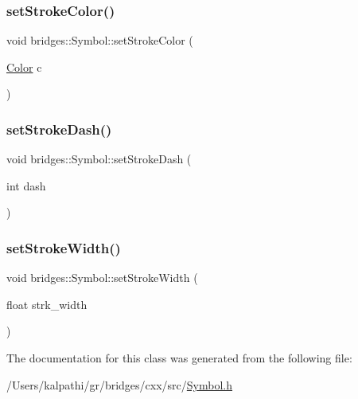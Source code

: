 \mbox{\label{classbridges_1_1_symbol_a813783a031eb5fcc841a549be384f876}} 
\subsubsection{\texorpdfstring{setStrokeColor()}{setStrokeColor()}}
{\footnotesize\ttfamily void bridges\+::\+Symbol\+::set\+Stroke\+Color (\begin{DoxyParamCaption}\item[{\mbox{\hyperlink{classbridges_1_1_color}{Color}}}]{c }\end{DoxyParamCaption})\hspace{0.3cm}{\ttfamily [inline]}}

\mbox{\label{classbridges_1_1_symbol_ab74d4afc6805db5be7613a82c7295c61}} 
\subsubsection{\texorpdfstring{setStrokeDash()}{setStrokeDash()}}
{\footnotesize\ttfamily void bridges\+::\+Symbol\+::set\+Stroke\+Dash (\begin{DoxyParamCaption}\item[{int}]{dash }\end{DoxyParamCaption})\hspace{0.3cm}{\ttfamily [inline]}}

\mbox{\label{classbridges_1_1_symbol_a29e8e8b80ea1aba0a99abdacd7c8ec17}} 
\subsubsection{\texorpdfstring{setStrokeWidth()}{setStrokeWidth()}}
{\footnotesize\ttfamily void bridges\+::\+Symbol\+::set\+Stroke\+Width (\begin{DoxyParamCaption}\item[{float}]{strk\+\_\+width }\end{DoxyParamCaption})\hspace{0.3cm}{\ttfamily [inline]}}



The documentation for this class was generated from the following file\+:\begin{DoxyCompactItemize}
\item 
/\+Users/kalpathi/gr/bridges/cxx/src/\mbox{\hyperlink{_symbol_8h}{Symbol.\+h}}\end{DoxyCompactItemize}
